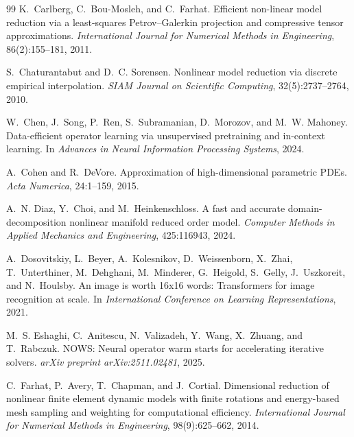 \documentclass{article}
\begin{document}
\begin{thebibliography}{99}
K.~Carlberg, C.~Bou-Mosleh, and C.~Farhat.
\newblock Efficient non-linear model reduction via a least-squares
Petrov--Galerkin projection and compressive tensor approximations.
\newblock \emph{International Journal for Numerical Methods in
Engineering}, 86(2):155--181, 2011.

S.~Chaturantabut and D.~C. Sorensen.
\newblock Nonlinear model reduction via discrete empirical
interpolation.
\newblock \emph{SIAM Journal on Scientific Computing}, 32(5):2737--2764,
2010.

W.~Chen, J.~Song, P.~Ren, S.~Subramanian, D.~Morozov, and M.~W.
Mahoney.
\newblock Data-efficient operator learning via unsupervised pretraining
and in-context learning.
\newblock In \emph{Advances in Neural Information Processing Systems},
2024.

A.~Cohen and R.~DeVore.
\newblock Approximation of high-dimensional parametric PDEs.
\newblock \emph{Acta Numerica}, 24:1--159, 2015.

A.~N. Diaz, Y.~Choi, and M.~Heinkenschloss.
\newblock A fast and accurate domain-decomposition nonlinear manifold
reduced order model.
\newblock \emph{Computer Methods in Applied Mechanics and Engineering},
425:116943, 2024.

A.~Dosovitskiy, L.~Beyer, A.~Kolesnikov, D.~Weissenborn, X.~Zhai,
T.~Unterthiner, M.~Dehghani, M.~Minderer, G.~Heigold, S.~Gelly,
J.~Uszkoreit, and N.~Houlsby.
\newblock An image is worth 16x16 words: Transformers for image
recognition at scale.
\newblock In \emph{International Conference on Learning Representations},
2021.

M.~S. Eshaghi, C.~Anitescu, N.~Valizadeh, Y.~Wang, X.~Zhuang, and
T.~Rabczuk.
\newblock NOWS: Neural operator warm starts for accelerating iterative
solvers.
\newblock \emph{arXiv preprint arXiv:2511.02481}, 2025.

C.~Farhat, P.~Avery, T.~Chapman, and J.~Cortial.
\newblock Dimensional reduction of nonlinear finite element dynamic
models with finite rotations and energy-based mesh sampling and
weighting for computational efficiency.
\newblock \emph{International Journal for Numerical Methods in
Engineering}, 98(9):625--662, 2014.


\end{thebibliography}
\end{document}
